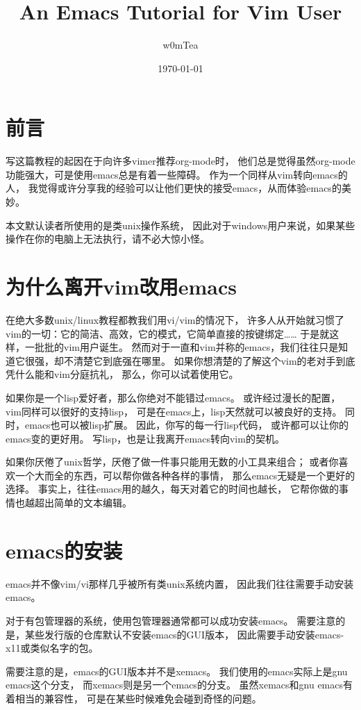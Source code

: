 \documentclass{article}
\author{w0mTea}
\date{\today}
\title{An Emacs Tutorial for Vim User}
\begin{document}
\maketitle
\tableofcontents

\newpage

\section{前言}
\label{sec-1}
写这篇教程的起因在于向许多vimer推荐org-mode时，
他们总是觉得虽然org-mode功能强大，可是使用emacs总是有着一些障碍。
作为一个同样从vim转向emacs的人，
我觉得或许分享我的经验可以让他们更快的接受emacs，从而体验emacs的美妙。

本文默认读者所使用的是类unix操作系统，
因此对于windows用户来说，如果某些操作在你的电脑上无法执行，请不必大惊小怪。
\section{为什么离开vim改用emacs}
\label{sec-2}
在绝大多数unix/linux教程都教我们用vi/vim的情况下，
许多人从开始就习惯了vim的一切：它的简洁、高效，它的模式，它简单直接的按键绑定……
于是就这样，一批批的vim用户诞生。
然而对于一直和vim并称的emacs，我们往往只是知道它很强，却不清楚它到底强在哪里。
如果你想清楚的了解这个vim的老对手到底凭什么能和vim分庭抗礼，
那么，你可以试着使用它。

如果你是一个lisp爱好者，那么你绝对不能错过emacs。
或许经过漫长的配置，vim同样可以很好的支持lisp，
可是在emacs上，lisp天然就可以被良好的支持。
同时，emacs也可以被lisp扩展。
因此，你写的每一行lisp代码，
或许都可以让你的emacs变的更好用。
写lisp，也是让我离开emacs转向vim的契机。

如果你厌倦了unix哲学，厌倦了做一件事只能用无数的小工具来组合；
或者你喜欢一个大而全的东西，可以帮你做各种各样的事情，
那么emacs无疑是一个更好的选择。
事实上，往往emacs用的越久，每天对着它的时间也越长，
它帮你做的事情也越超出简单的文本编辑。
\section{emacs的安装}
\label{sec-3}
emacs并不像vim/vi那样几乎被所有类unix系统内置，
因此我们往往需要手动安装emacs。

对于有包管理器的系统，使用包管理器通常都可以成功安装emacs。
需要注意的是，某些发行版的仓库默认不安装emacs的GUI版本，
因此需要手动安装emacs-x11或类似名字的包。

需要注意的是，emacs的GUI版本并不是xemacs。
我们使用的emacs实际上是gnu emacs这个分支，
而xemacs则是另一个emacs的分支。
虽然xemacs和gnu emacs有着相当的兼容性，
可是在某些时候难免会碰到奇怪的问题。
\end{document}
